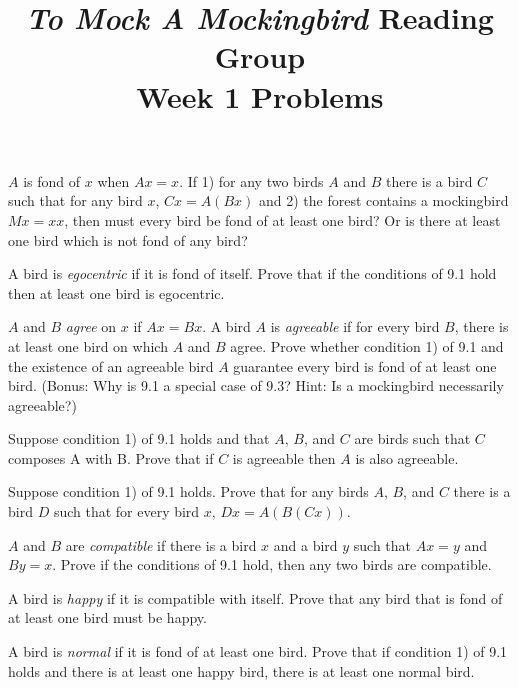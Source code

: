 \documentclass[12pt, letterpaper]{article}
\title{\emph{To Mock A Mockingbird} Reading Group\\Week 1 Problems}
\begin{document}
\maketitle

\disclaimer

\begin{prob}{9.1}
$A$ is fond of $x$ when $Ax = x$. If 1) for any two birds $A$ and $B$ there is a bird $C$ such that for any bird $x$, $Cx = A(Bx)$ and 2) the forest contains a mockingbird $Mx = xx$, then must every bird be fond of at least one bird? Or is there at least one bird which is not fond of any bird?
\end{prob}

\begin{prob}{9.2}
A bird is \emph{egocentric} if it is fond of itself. Prove that if the conditions of 9.1 hold then at least one bird is egocentric.
\end{prob}

\begin{prob}{9.3}
$A$ and $B$ \emph{agree} on $x$ if $Ax = Bx$. A bird $A$ is \emph{agreeable} if for every bird $B$, there is at least one bird on which $A$ and $B$ agree. Prove whether condition 1) of 9.1 and the existence of an agreeable bird $A$ guarantee every bird is fond of at least one bird. (Bonus: Why is 9.1 a special case of 9.3? Hint: Is a mockingbird necessarily agreeable?)
\end{prob}

\begin{prob}{9.4}
Suppose condition 1) of 9.1 holds and that $A$, $B$, and $C$ are birds such that $C$ composes A with B. Prove that if $C$ is agreeable then $A$ is also agreeable.
\end{prob}

\begin{prob}{9.5}
Suppose condition 1) of 9.1 holds. Prove that for any birds $A$, $B$, and $C$ there is a bird $D$ such that for every bird $x$, $Dx = A(B(Cx))$.
\end{prob}

\begin{prob}{9.6}
$A$ and $B$ are \emph{compatible} if there is a bird $x$ and a bird $y$ such that $Ax = y$ and $By = x$. Prove if the conditions of 9.1 hold, then any two birds are compatible.
\end{prob}

\begin{prob}{9.7}
A bird is \emph{happy} if it is compatible with itself. Prove that any bird that is fond of at least one bird must be happy.
\end{prob}

\begin{prob}{9.8}
A bird is \emph{normal} if it is fond of at least one bird. Prove that if condition 1) of 9.1 holds and there is at least one happy bird, there is at least one normal bird.
\end{prob}
\end{document}
